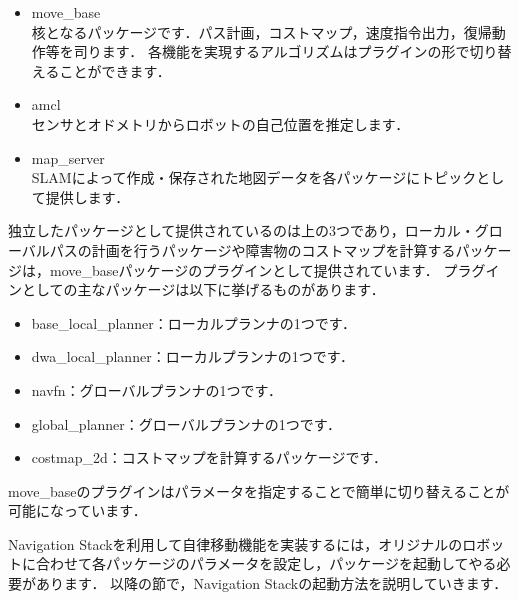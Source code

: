 \documentclass[{../../master}]{subfiles}
\begin{document}
\begin{itemize}
  \item \textsf{move\_base} \\
    核となるパッケージです．パス計画，コストマップ，速度指令出力，復帰動作等を司ります．
    各機能を実現するアルゴリズムはプラグインの形で切り替えることができます．
  \item \textsf{amcl} \\
    センサとオドメトリからロボットの自己位置を推定します．
  \item \textsf{map\_server} \\
    SLAMによって作成・保存された地図データを各パッケージにトピックとして提供します．
\end{itemize}

独立したパッケージとして提供されているのは上の3つであり，ローカル・グローバルパスの計画を行うパッケージや障害物のコストマップを計算するパッケージは，\textsf{move\_base}パッケージのプラグインとして提供されています．
プラグインとしての主なパッケージは以下に挙げるものがあります．

\begin{itemize}
  \item \textsf{base\_local\_planner}：ローカルプランナの1つです．
  \item \textsf{dwa\_local\_planner}：ローカルプランナの1つです．
  \item \textsf{navfn}：グローバルプランナの1つです．
  \item \textsf{global\_planner}：グローバルプランナの1つです．
  \item \textsf{costmap\_2d}：コストマップを計算するパッケージです．
\end{itemize}

\textsf{move\_base}のプラグインはパラメータを指定することで簡単に切り替えることが可能になっています．

Navigation Stackを利用して自律移動機能を実装するには，オリジナルのロボットに合わせて各パッケージのパラメータを設定し，パッケージを起動してやる必要があります．
以降の節で，Navigation Stackの起動方法を説明していきます．
\end{document}
